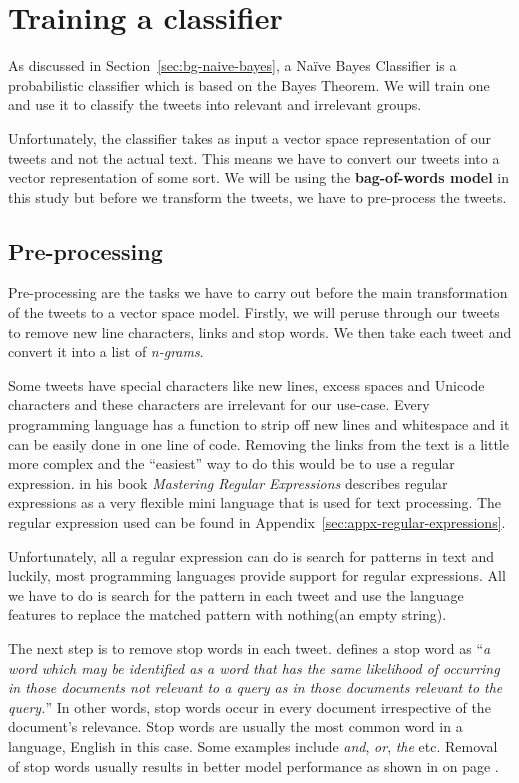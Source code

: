 \section{Training a classifier}
\label{sec:training-classifier}
As discussed in Section~\ref{sec:bg-naive-bayes}, a Na\"{i}ve Bayes Classifier is a probabilistic
classifier which is based on the Bayes Theorem. We will train one and use it to classify the tweets
into relevant and irrelevant groups.

Unfortunately, the classifier takes as input a vector space representation of our tweets and not the
actual text. This means we have to convert our tweets into a vector representation of some sort. We
will be using the \textbf{bag-of-words model} in this study but before we transform the tweets, we
have to pre-process the tweets.

\subsection{Pre-processing}
\label{sec:classification-preprocessing}
Pre-processing are the tasks we have to carry out before the main transformation of the tweets to a
vector space model. Firstly, we will peruse through our tweets to remove new line characters, links
and stop words. We then take each tweet and convert it into a list of \textit{n-grams}.

Some tweets have special characters like new lines, excess spaces and Unicode characters and these
characters are irrelevant for our use-case. Every programming language has a function to strip
off new lines and whitespace and it can be easily done in one line of code. Removing the links from
the text is a little more complex and the ``easiest'' way to do this would be to use a regular
expression. \citet{friedl2006mastering} in his book \textit{Mastering Regular Expressions} describes
regular expressions as a very flexible mini language that is used for text processing. The regular
expression used can be found in Appendix~\ref{sec:appx-regular-expressions}.

Unfortunately, all a regular expression can do is search for patterns in text and luckily, most
programming languages provide support for regular expressions. All we have to do is search for the
pattern in each tweet and use the language features to replace the matched pattern with nothing(an
empty string).

The next step is to remove stop words in each tweet. \citet{wilbur1992automatic} defines a stop word
as ``\textit{a word which may be identified as a word that has the same likelihood of occurring in
those documents not relevant to a query as in those documents relevant to the query.}'' In other
words, stop words occur in every document irrespective of the document's relevance. Stop words are
usually the most common word in a language, English in this case. Some examples include
\textit{and}, \textit{or}, \textit{the} etc. Removal of stop words usually results in better model
performance as shown in  on page
\pageref{fig:auc-curves-stopwords}.

